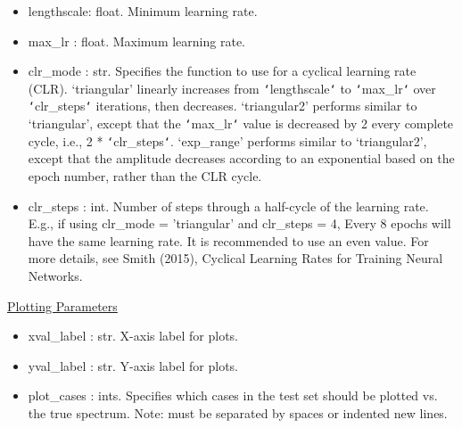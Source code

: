 \documentclass[letterpaper, 12pt]{article}
\begin{document}
\begin{itemize}
\item lengthscale: float. Minimum learning rate.
\item max\_lr     : float. Maximum learning rate.
\item clr\_mode   : str.   Specifies the function to use for a cyclical 
                    learning rate (CLR).
                    `triangular' linearly increases from 
                    \texttt{`}lengthscale\texttt{`} to 
                    \texttt{`}max\_lr\texttt{`} over 
                    \texttt{`}clr\_steps\texttt{`} iterations, then decreases.
                    `triangular2' performs similar to `triangular', except that 
                    the \texttt{`}max\_lr\texttt{`} value is decreased by 2 
                    every complete cycle, i.e., 2 * 
                    \texttt{`}clr\_steps\texttt{`}.
                    `exp\_range' performs similar to `triangular2', except that 
                    the amplitude decreases according to an exponential based 
                    on the epoch number, rather than the CLR cycle.
\item clr\_steps  : int.   Number of steps through a half-cycle of the learning 
                           rate.
                    E.g., if using clr\_mode = 'triangular' and clr\_steps = 4, 
                    Every 8 epochs will have the same learning rate.
                    It is recommended to use an even value.
                    For more details, see Smith (2015), Cyclical Learning Rates 
                    for Training Neural Networks.
\end{itemize}

\noindent \underline{Plotting Parameters}
\begin{itemize}
\item xval\_label : str.  X-axis label for plots.
\item yval\_label : str.  Y-axis label for plots.
\item plot\_cases : ints. Specifies which cases in the test set should be 
                   plotted vs. the true spectrum.
                   Note: must be separated by spaces or indented new lines.
\end{itemize}
\end{document}

